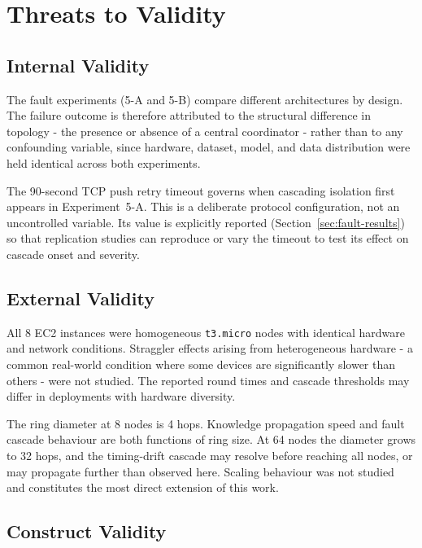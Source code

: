 \documentclass[12pt]{report}
\begin{document}
\section{Threats to Validity}
\label{sec:threats}

\subsection*{Internal Validity}

The fault experiments (5-A and 5-B) compare different architectures by design.
The failure outcome is therefore attributed to the structural difference in
topology - the presence or absence of a central coordinator - rather than
to any confounding variable, since hardware, dataset, model, and data
distribution were held identical across both experiments.

The 90-second TCP push retry timeout governs when cascading isolation first
appears in Experiment~5-A. This is a deliberate protocol configuration, not an
uncontrolled variable. Its value is explicitly reported (Section~\ref{sec:fault-results})
so that replication studies can reproduce or vary the timeout to test its effect
on cascade onset and severity.

\subsection*{External Validity}

All 8 EC2 instances were homogeneous \texttt{t3.micro} nodes with identical
hardware and network conditions. Straggler effects arising from heterogeneous
hardware - a common real-world condition where some devices are significantly
slower than others - were not studied. The reported round times and cascade
thresholds may differ in deployments with hardware diversity.

The ring diameter at 8 nodes is 4 hops. Knowledge propagation speed and fault
cascade behaviour are both functions of ring size. At 64 nodes the diameter
grows to 32 hops, and the timing-drift cascade may resolve before reaching all
nodes, or may propagate further than observed here. Scaling behaviour was not
studied and constitutes the most direct extension of this work.

\subsection*{Construct Validity}
\end{document}
